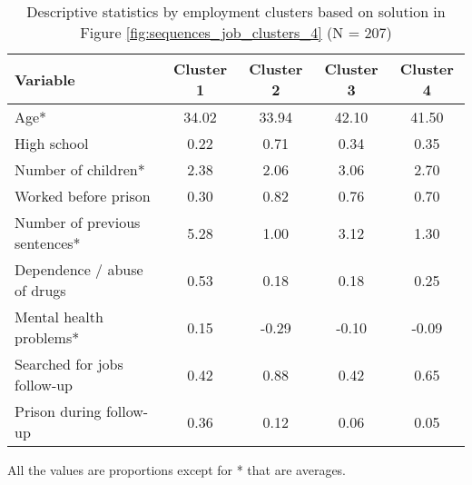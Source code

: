 \begin{table}[htp]
\footnotesize
\setlength{\tabcolsep}{10pt}
\renewcommand{\arraystretch}{1.3}
\begin{threeparttable}
\centering
\caption{Descriptive statistics by employment clusters \newline based on solution in Figure \ref{fig:sequences_job_clusters_4} (N = 207)} 
\label{tab:descriptive_job_clusters_4}
\begin{tabular}{lcccc}
  \hline
Variable & Cluster 1 & Cluster 2 & Cluster 3 & Cluster 4 \\ 
  \hline
Age* & 34.02 & 33.94 & 42.10 & 41.50 \\ 
  High school & 0.22 & 0.71 & 0.34 & 0.35 \\ 
  Number of children* & 2.38 & 2.06 & 3.06 & 2.70 \\ 
  Worked before prison & 0.30 & 0.82 & 0.76 & 0.70 \\ 
  Number of previous sentences* & 5.28 & 1.00 & 3.12 & 1.30 \\ 
  Dependence / abuse of drugs & 0.53 & 0.18 & 0.18 & 0.25 \\ 
  Mental health problems* & 0.15 & -0.29 & -0.10 & -0.09 \\ 
  Searched for jobs follow-up & 0.42 & 0.88 & 0.42 & 0.65 \\ 
  Prison during follow-up & 0.36 & 0.12 & 0.06 & 0.05 \\ 
   \hline
\end{tabular}
\begin{tablenotes}
\scriptsize
\item All the values are proportions except for * that are averages.
\end{tablenotes}
\end{threeparttable}
\end{table}
